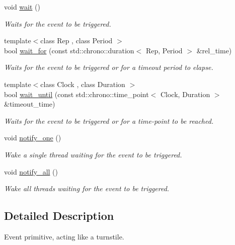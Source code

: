 \begin{DoxyCompactItemize}
\item 
void \hyperlink{classcpen333_1_1thread_1_1event_a041bc99b2749b269ac3853a4b8bba678}{wait} ()
\begin{DoxyCompactList}\small\item\em Waits for the event to be triggered. \end{DoxyCompactList}\item 
{\footnotesize template$<$class Rep , class Period $>$ }\\bool \hyperlink{classcpen333_1_1thread_1_1event_a200e1b4dff248be78cc1ae9c993dec02}{wait\+\_\+for} (const std\+::chrono\+::duration$<$ Rep, Period $>$ \&rel\+\_\+time)
\begin{DoxyCompactList}\small\item\em Waits for the event to be triggered or for a timeout period to elapse. \end{DoxyCompactList}\item 
{\footnotesize template$<$class Clock , class Duration $>$ }\\bool \hyperlink{classcpen333_1_1thread_1_1event_aeea6876ad13a451c66868849fa23ec16}{wait\+\_\+until} (const std\+::chrono\+::time\+\_\+point$<$ Clock, Duration $>$ \&timeout\+\_\+time)
\begin{DoxyCompactList}\small\item\em Waits for the event to be triggered or for a time-\/point to be reached. \end{DoxyCompactList}\item 
void \hyperlink{classcpen333_1_1thread_1_1event_a453552a68dff5c45321496e452495364}{notify\+\_\+one} ()
\begin{DoxyCompactList}\small\item\em Wake a single thread waiting for the event to be triggered. \end{DoxyCompactList}\item 
void \hyperlink{classcpen333_1_1thread_1_1event_ac41756fc84760cd537c78de31b3b25fa}{notify\+\_\+all} ()
\begin{DoxyCompactList}\small\item\em Wake all threads waiting for the event to be triggered. \end{DoxyCompactList}\end{DoxyCompactItemize}


\subsection{Detailed Description}
Event primitive, acting like a turnstile. 

